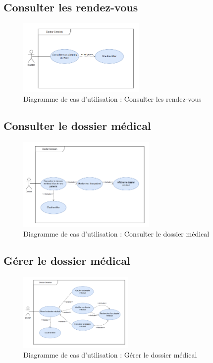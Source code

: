\documentclass[a4paper]{report}
\begin{document}
\subsection{Consulter les rendez-vous}
\begin{figure}[H]
    \vspace{-10pt}
    \centering
    \includegraphics[width=0.55\textwidth]{besoins/consulter-rdv.png}
    \caption{Diagramme de cas d'utilisation : Consulter les rendez-vous}
    \label{fig:DCU5}
\end{figure}

\subsection{Consulter le dossier médical}
\begin{figure}[H]
    \vspace{-10pt}
    \centering
    \includegraphics[width=0.6\textwidth]{besoins/consulter-dossier-medical.png}
    \caption{Diagramme de cas d'utilisation : Consulter le dossier médical}
    \label{fig:DCU6}
\end{figure}

\subsection{Gérer le dossier médical}
\begin{figure}[H]
    \vspace{-10pt}
    \centering
    \includegraphics[width=0.5\textwidth]{besoins/gerer-dossier-medical.png}
    \caption{Diagramme de cas d'utilisation : Gérer le dossier médical}
    \label{fig:DCU7}
\end{figure}
\end{document}
